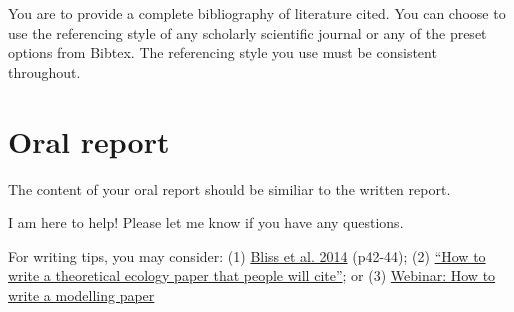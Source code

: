 \documentclass[]{book}
\begin{document}
You are to provide a complete bibliography of literature cited. You can
choose to use the referencing style of any scholarly scientific journal
or any of the preset options from Bibtex. The referencing style you use
must be consistent throughout.

\section{Oral report}\label{oral-report}

The content of your oral report should be similiar to the written
report.

I am here to help! Please let me know if you have any questions.

For writing tips, you may consider: (1)
\href{https://m3challenge.siam.org/sites/default/files/uploads/siam-guidebook-final-press.pdf}{Bliss
et al. 2014} (p42-44); (2)
\href{http://matryoshka.org/2012/07/13/how-to-write-a-paper-people-will-cite/}{``How
to write a theoretical ecology paper that people will cite''}; or (3)
\href{https://video.mbi.ohio-state.edu/video/player/?id=4775\&title=Webinar\%3A\%20How\%20to\%20Write\%20a\%20Modelling\%20Paper}{Webinar:
How to write a modelling paper}
\end{document}
